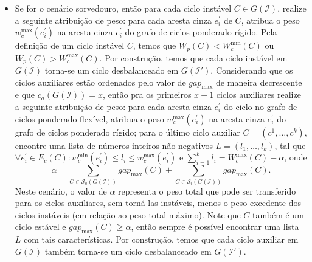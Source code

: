 \begin{itemize}
\begin{itemize}
    \item Se for o cenário sorvedouro, então para cada ciclo instável $C \in G(\mathcal{I})$, realize a seguinte atribuição de peso: para cada aresta cinza $e^{\prime}_i$ de $C$, atribua o peso $w^{\max}_c(e^{\prime}_i)$ na aresta cinza $e^{\prime}_i$ do grafo de ciclos ponderado rígido. Pela definição de um ciclo instável $C$, temos que $W_p(C)  < W^{\min}_c(C)$ ou $W_p(C) > W^{\max}_c(C)$. Por construção, temos que cada ciclo instável em $G(\mathcal{I})$ torna-se um ciclo desbalanceado em $G(\mathcal{I}')$. Considerando que os ciclos auxiliares estão ordenados pelo valor de $gap_{\max}$ de maneira decrescente e que $c_a(G(\mathcal{I})) = x$, então pra os primeiros $x-1$ ciclos auxiliares realize a seguinte atribuição de peso: para cada aresta cinza $e^{\prime}_i$ do ciclo no grafo de ciclos ponderado flexível, atribua o peso $w^{\max}_c(e^{\prime}_i)$ na aresta cinza $e^{\prime}_i$ do grafo de ciclos ponderado rígido; para o último ciclo auxiliar $C=(c^1,\dots,c^k)$, encontre uma lista de números inteiros não negativos $L=(l_1,\dots,l_k)$, tal que $\forall e^{\prime}_i \in E_c(C): w^{\min}_c(e^{\prime}_i) \le l_i \le w^{\max}_c(e^{\prime}_i)$ e $\sum_{i=1}^{k}l_i = W^{\max}_c(C) - \alpha$, onde 
    $$\alpha = \sum_{C \in \mathcal{S}_a(G(\mathcal{I}))} gap_{\max}(C) + \sum_{C \in \mathcal{S}_i(G(\mathcal{I}))} gap_{\max}(C).$$ 
    Neste cenário, o valor de $\alpha$ representa o peso total que pode ser transferido para os ciclos auxiliares, sem torná-las instáveis, menos o peso excedente dos ciclos instáveis (em relação ao peso total máximo). Note que $C$ também é um ciclo estável e $gap_{\max}(C) \ge \alpha$, então sempre é possível encontrar uma lista $L$ com tais características. Por construção, temos que cada ciclo auxiliar em $G(\mathcal{I})$ também torna-se um ciclo desbalanceado em $G(\mathcal{I}')$.


\end{itemize}
\end{itemize}

